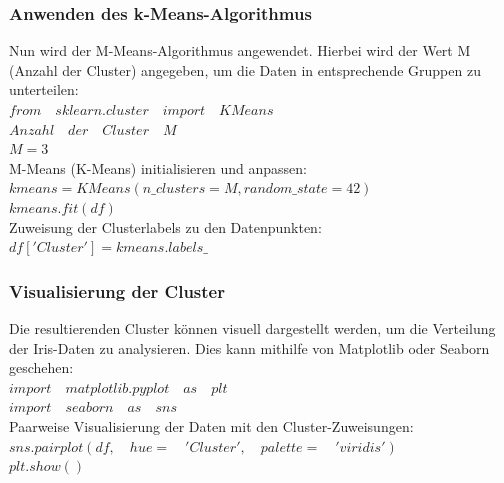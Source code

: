 \documentclass[12pt]{article}
\begin{document}
\subsubsection{Anwenden des k-Means-Algorithmus}
%
Nun wird der M-Means-Algorithmus angewendet. Hierbei wird der Wert M (Anzahl der Cluster) angegeben, um die Daten in entsprechende Gruppen zu unterteilen:\\[0.2cm]
%
$ from\quad sklearn.cluster\quad import\quad KMeans $ \\
$ Anzahl\quad der\quad Cluster\quad M $ \\
$ M = 3 $ \\[0.2cm]
%
M-Means (K-Means) initialisieren und anpassen:\\[0.2cm]
$ kmeans = KMeans(n\_clusters = M, random\_state = 42) $\\
$ kmeans.fit(df) $ \\[0.2cm]
%
Zuweisung der Clusterlabels zu den Datenpunkten:\\[0.2cm]
$ df['Cluster'] = kmeans.labels\_ $

\subsubsection{Visualisierung der Cluster}
%
Die resultierenden Cluster können visuell dargestellt werden, um die Verteilung der Iris-Daten zu analysieren. Dies kann mithilfe von Matplotlib oder Seaborn geschehen: \\[0.2cm]
%
$ import\quad matplotlib.pyplot\quad as\quad plt $\\
$ import\quad seaborn\quad as\quad sns $ \\[0.2cm]
%
Paarweise Visualisierung der Daten mit den Cluster-Zuweisungen: \\[0.2cm]
$ sns.pairplot(df,\quad hue =\quad 'Cluster',\quad palette =\quad 'viridis') $\\
$ plt.show()$
\end{document}
